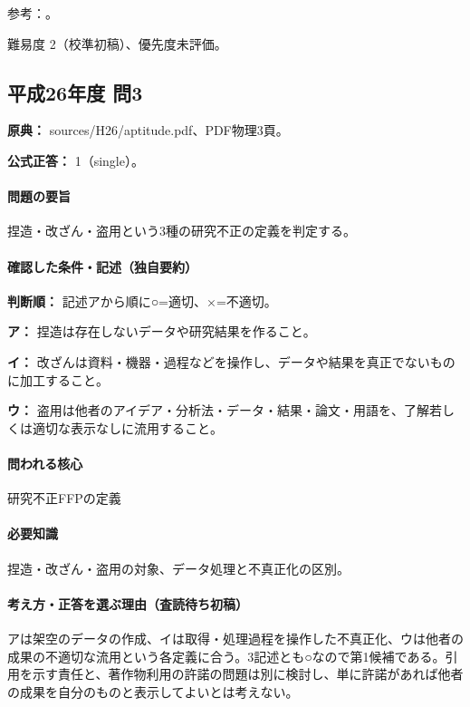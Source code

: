 \par 参考：\cite{scj_code2013}。

\par 難易度 2（校準初稿）、優先度未評価。

\subsection{平成26年度 問3}
\label{q:h26-reg-apt-03}

\noindent\textbf{原典：} sources/H26/aptitude.pdf、PDF物理3頁。

\textbf{公式正答：} 1（single）。

\paragraph{問題の要旨} 捏造・改ざん・盗用という3種の研究不正の定義を判定する。

\paragraph{確認した条件・記述（独自要約）}\mbox{}\par

\noindent\textbf{判断順：} 記述アから順に○=適切、×=不適切。\par

\noindent\textbf{ア：} 捏造は存在しないデータや研究結果を作ること。\par

\noindent\textbf{イ：} 改ざんは資料・機器・過程などを操作し、データや結果を真正でないものに加工すること。\par

\noindent\textbf{ウ：} 盗用は他者のアイデア・分析法・データ・結果・論文・用語を、了解若しくは適切な表示なしに流用すること。\par

\paragraph{問われる核心} 研究不正FFPの定義

\paragraph{必要知識} 捏造・改ざん・盗用の対象、データ処理と不真正化の区別。

\paragraph{考え方・正答を選ぶ理由（査読待ち初稿）} アは架空のデータの作成、イは取得・処理過程を操作した不真正化、ウは他者の成果の不適切な流用という各定義に合う。3記述とも○なので第1候補である。引用を示す責任と、著作物利用の許諾の問題は別に検討し、単に許諾があれば他者の成果を自分のものと表示してよいとは考えない。

